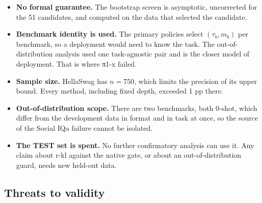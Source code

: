 \begin{itemize}
  decisions is unmeasured.
\item
  \textbf{No formal guarantee.} The bootstrap screen is asymptotic, uncorrected for the 51 candidates, and computed on the data that selected the
  candidate.
\item
  \textbf{Benchmark identity is used.} The primary policies select \((\tau_b, m_b)\) per benchmark, so a deployment would need to know the task. The
  out-of-distribution analysis used one task-agnostic pair and is the closer model of deployment. That is where π1-x failed.
\item
  \textbf{Sample size.} HellaSwag has \(n = 750\), which limits the precision of its upper bound. Every method, including fixed depth, exceeded 1 pp there.
\item
  \textbf{Out-of-distribution scope.} There are two benchmarks, both 0-shot, which differ from the development data in format and in task at once,
  so the source of the Social IQa failure cannot be isolated.
\item
  \textbf{The TEST set is spent.} No further confirmatory analysis can use it. Any claim about r-kl against the native gate, or about an
  out-of-distribution guard, needs new held-out data.
\end{itemize}

\subsection{Threats to validity}

